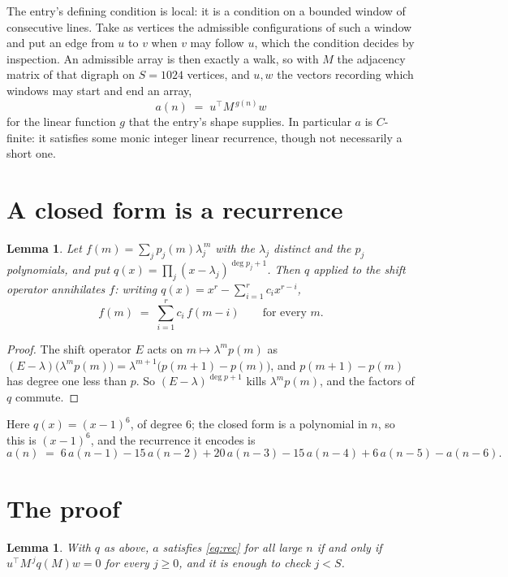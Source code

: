 \documentclass[11pt,a4paper]{article}
\theoremstyle{plain}
\newtheorem{lemma}[theorem]{Lemma}
\theoremstyle{definition}
\begin{document}
The entry's defining condition is local: it is a condition on a bounded window of consecutive lines. Take as vertices the
admissible configurations of such a window and put an edge from $u$ to $v$ when $v$ may
follow $u$, which the condition decides by inspection. An admissible array is then exactly a
walk, so with $M$ the adjacency matrix of that digraph on $S=1024$ vertices, and $u,w$ the
vectors recording which windows may start and end an array,
\[
a(n)\;=\;u^{\!\top}M^{\,g(n)}w
\]
for the linear function $g$ that the entry's shape supplies. In particular $a$ is
$C$-finite: it satisfies some monic integer linear recurrence, though not necessarily a short
one.

\section{A closed form is a recurrence}

\begin{lemma}\label{lem:ann}
Let $f(m)=\sum_{j}p_j(m)\lambda_j^{\,m}$ with the $\lambda_j$ distinct and the $p_j$
polynomials, and put $q(x)=\prod_j(x-\lambda_j)^{\deg p_j+1}$. Then $q$ applied to the shift
operator annihilates $f$: writing $q(x)=x^{r}-\sum_{i=1}^{r}c_ix^{r-i}$,
\[
f(m)\;=\;\sum_{i=1}^{r}c_i\,f(m-i)\qquad\text{for every }m.
\]
\end{lemma}

\begin{proof}
The shift operator $E$ acts on $m\mapsto\lambda^{m}p(m)$ as
$(E-\lambda)\bigl(\lambda^{m}p(m)\bigr)=\lambda^{m+1}\bigl(p(m+1)-p(m)\bigr)$, and
$p(m+1)-p(m)$ has degree one less than $p$. So $(E-\lambda)^{\deg p+1}$ kills
$\lambda^{m}p(m)$, and the factors of $q$ commute.
\end{proof}

Here $q(x)=(x-1)^{6}$, of degree $6$; the closed form is a polynomial in $n$, so this is $(x-1)^{6}$, and the recurrence it encodes is
\begin{equation}\label{eq:rec}
a(n)\;=\;6\,a(n-1) - 15\,a(n-2) + 20\,a(n-3) - 15\,a(n-4) + 6\,a(n-5) - a(n-6).
\end{equation}

\section{The proof}

\begin{lemma}\label{lem:crit}
With $q$ as above, $a$ satisfies \eqref{eq:rec} for all large $n$ if and only if
$u^{\!\top}M^{\,j}q(M)w=0$ for every $j\ge0$, and it is enough to check $j<S$.
\end{lemma}
\end{document}
